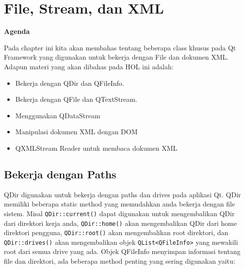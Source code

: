 \section{File, Stream, dan XML}\label{file-stream-dan-xml}

\textbf{Agenda}

Pada chapter ini kita akan membahas tentang beberapa class khusus pada
Qt Framework yang digunakan untuk bekerja dengan File dan dokumen XML.
Adapun materi yang akan dibahas pada HOL ini adalah:

\begin{itemize}
\tightlist
\item
  Bekerja dengan QDir dan QFileInfo.
\item
  Bekerja dengan QFile dan QTextStream.
\item
  Menggunakan QDataStream
\item
  Manipulasi dokumen XML dengan DOM
\item
  QXMLStream Reader untuk membaca dokumen XML
\end{itemize}

\subsection{Bekerja dengan Paths}\label{bekerja-dengan-paths}

QDir digunakan untuk bekerja dengan paths dan drives pada aplikasi Qt.
QDir memiliki beberapa static method yang memudahkan anda bekerja dengan
file sistem. Misal \texttt{QDir::current()} dapat digunakan untuk
mengembalikan QDir dari direktori kerja anda, \texttt{QDir::home()} akan
mengembalikan QDir dari home direktori pengguna, \texttt{QDir::root()}
akan mengembalikan root direktori, dan \texttt{QDir::drives()} akan
mengembalikan objek \texttt{QList\textless{}QFileInfo\textgreater{}}
yang mewakili root dari semua drive yang ada. Objek QFileInfo menyimpan
informasi tentang file dan direktori, ada beberapa method penting yang
sering digunakan yaitu:

